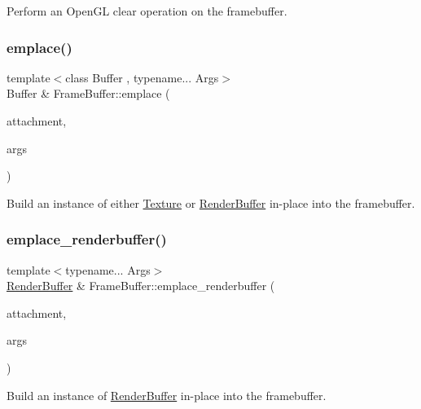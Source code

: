 Perform an Open\+GL clear operation on the framebuffer. \mbox{\label{class_frame_buffer_a291fd980cff8634390c5d6690b70b661}} 
\subsubsection{\texorpdfstring{emplace()}{emplace()}}
{\footnotesize\ttfamily template$<$class Buffer , typename... Args$>$ \\
Buffer \& Frame\+Buffer\+::emplace (\begin{DoxyParamCaption}\item[{G\+Lenum}]{attachment,  }\item[{Args \&\&...}]{args }\end{DoxyParamCaption})}

Build an instance of either \mbox{\hyperlink{class_texture}{Texture}} or \mbox{\hyperlink{class_render_buffer}{Render\+Buffer}} in-\/place into the framebuffer. \mbox{\label{class_frame_buffer_afa5e09f8734d0692bcec072593faecc9}} 
\subsubsection{\texorpdfstring{emplace\+\_\+renderbuffer()}{emplace\_renderbuffer()}}
{\footnotesize\ttfamily template$<$typename... Args$>$ \\
\mbox{\hyperlink{class_render_buffer}{Render\+Buffer}} \& Frame\+Buffer\+::emplace\+\_\+renderbuffer (\begin{DoxyParamCaption}\item[{G\+Lenum}]{attachment,  }\item[{Args \&\&...}]{args }\end{DoxyParamCaption})}

Build an instance of \mbox{\hyperlink{class_render_buffer}{Render\+Buffer}} in-\/place into the framebuffer. \mbox{\label{class_frame_buffer_a0711e3396075d2d5a2f6fe0185b3d0ab}} 

